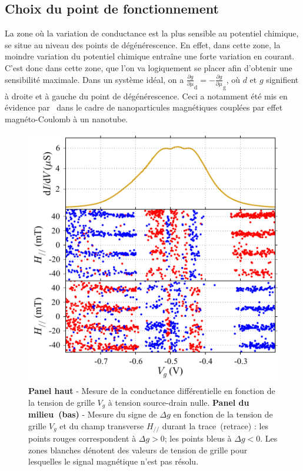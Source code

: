 \subsection{Choix du point de fonctionnement}
La zone où la variation de conductance est la plus sensible au potentiel chimique, se situe au niveau des points de dégénérescence. En effet, dans cette zone, la moindre variation du potentiel chimique entraîne une forte variation en courant. C'est donc dans cette zone, que l'on va logiquement se placer afin d'obtenir une sensibilité maximale. Dans un système idéal, on a $\frac{\partial g}{\partial \mu}_{\text{d}} = -\frac{\partial g}{\partial \mu}_{\text{g}}$, où $d$ et $g$ signifient à droite et à gauche du point de dégénérescence. Ceci a notamment été mis en évidence par~\cite{Datta2011} dans le cadre de nanoparticules magnétiques couplées par effet magnéto-Coulomb à un nanotube.

\begin{figure}
\parbox{7cm}{
\includegraphics[scale=0.45]{Resultats/PointFonct/PointFonct.pdf} 
}
\parbox{6.5cm}{\caption{\textbf{Panel haut} - Mesure de la conductance différentielle en fonction de la tension de grille $V_g$ à tension source-drain nulle. \textbf{Panel du milieu~(bas)} - Mesure du signe de $\Delta g$ en fonction de la tension de grille $V_g$ et du champ transverse $H_{//}$ durant la trace~(retrace) : les points rouges correspondent à $\Delta g >0$; les points bleus à $\Delta g <0$. Les zones blanches dénotent des valeurs de tension de grille pour lesquelles le signal magnétique n'est pas résolu.}
\label{point_fonctio}
}
\end{figure}

